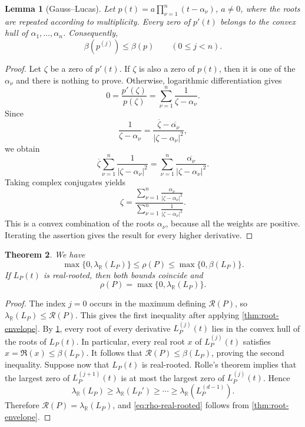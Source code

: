 \documentclass[reqno, 12pt]{article}
\numberwithin{equation}{section}
\newtheorem{theorem}{Theorem}[section]
\newtheorem{lemma}[theorem]{Lemma}
\theoremstyle{definition}
\newcommand{\R}{\mathbb{R}}
\begin{document}
\begin{lemma}[Gauss--Lucas]\label{lem:gauss-lucas}
Let $p(t)=a\prod_{\nu=1}^{n}(t-\alpha_\nu)$, $a\neq0$, where the roots are repeated according to multiplicity.  Every zero of $p'(t)$ belongs to the convex hull of $\alpha_1,\ldots,\alpha_n$.  Consequently,
\[\beta\!\left(p^{(j)}\right)\leq\beta(p)\qquad(0\leq j<n).
\]
\end{lemma}
\begin{proof}
Let $\zeta$ be a zero of $p'(t)$.  If $\zeta$ is also a zero of $p(t)$, then it is one of the $\alpha_\nu$ and there is nothing to prove.  Otherwise, logarithmic differentiation gives
\[0=\frac{p'(\zeta)}{p(\zeta)} =\sum_{\nu=1}^{n}\frac1{\zeta-\alpha_\nu}.
\]
Since
\[\frac1{\zeta-\alpha_\nu}=\frac{\overline{\zeta}-\overline{\alpha_\nu}}{|\zeta-\alpha_\nu|^2},
\]
we obtain
\[
 \overline{\zeta}
 \sum_{\nu=1}^{n}\frac1{|\zeta-\alpha_\nu|^2}
 =
 \sum_{\nu=1}^{n}
 \frac{\overline{\alpha_\nu}}{|\zeta-\alpha_\nu|^2}.
\]
Taking complex conjugates yields
\[
 \zeta
 =
 \frac{\displaystyle
       \sum_{\nu=1}^{n}
       \frac{\alpha_\nu}{|\zeta-\alpha_\nu|^2}}
      {\displaystyle
       \sum_{\nu=1}^{n}
       \frac1{|\zeta-\alpha_\nu|^2}}.
\]
This is a convex combination of the roots $\alpha_\nu$, because all the weights are positive.  Iterating the assertion gives the result for every higher derivative.
\end{proof}

\begin{theorem}\label{thm:rho-root-sandwich}
We have 
\begin{equation}\label{eq:rho-root-sandwich}
\max\{0,\lambda_{\R}(L_P)\}\leq \rho(P)\leq \max\{0,\beta(L_P)\}.
\end{equation}
If $L_P(t)$ is real-rooted, then both bounds coincide and
\begin{equation}\label{eq:rho-real-rooted}
 \rho(P)=\max\{0,\lambda_{\R}(L_P)\}.
\end{equation}
\end{theorem}

\begin{proof}
The index $j=0$ occurs in the maximum defining $\mathcal R(P)$, so $\lambda_{\R}(L_P)\leq\mathcal R(P)$.
This gives the first inequality after applying \cref{thm:root-envelope}.
By \cref{lem:gauss-lucas}, every root of every derivative $L_P^{(j)}(t)$ lies in the convex hull of the roots of $L_P(t)$.  In particular, every real root $x$ of $L_P^{(j)}(t)$ satisfies $x=\Re(x)\leq\beta(L_P)$.
It follows that $\mathcal R(P)\leq\beta(L_P)$, proving the second inequality.
Suppose now that $L_P(t)$ is real-rooted.  Rolle's theorem implies that the largest zero of $L_P^{(j+1)}(t)$ is at most the largest zero of $L_P^{(j)}(t)$.  Hence
\[\lambda_{\R}(L_P)\geq\lambda_{\R}(L_P')\geq\cdots\geq\lambda_{\R}(L_P^{(d-1)}).
\]
Therefore $\mathcal R(P)=\lambda_{\R}(L_P)$, and \eqref{eq:rho-real-rooted} follows from \cref{thm:root-envelope}.
\end{proof}
\end{document}
